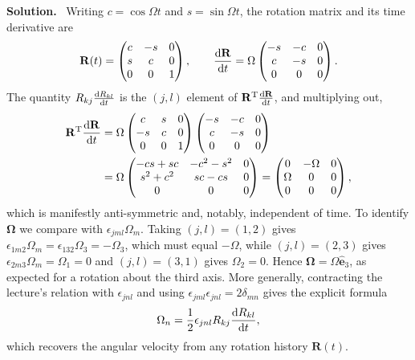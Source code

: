 \documentclass[a4paper,12pt]{paper}
\newenvironment{solution}{\par\noindent\textbf{Solution.}\ }{\par\medskip}
\begin{document}
\begin{solution}
Writing $c=\cos\Omega t$ and $s=\sin\Omega t$, the rotation matrix and its time derivative are
\begin{equation}
\mathbf{R}(t)=\begin{pmatrix}c&-s&0\\ s&c&0\\ 0&0&1\end{pmatrix},\qquad
\frac{\mathrm{d}\mathbf{R}}{\mathrm{d} t}=\Omega\begin{pmatrix}-s&-c&0\\ c&-s&0\\ 0&0&0\end{pmatrix}.
\label{eq:13}
\end{equation}
The quantity $R_{kj}\frac{\mathrm{d} R_{kl}}{\mathrm{d} t}$ is the $(j,l)$ element of
$\mathbf{R}^{\mathrm{T}}\frac{\mathrm{d}\mathbf{R}}{\mathrm{d} t}$, and multiplying out,
\begin{equation}
\begin{split}
\mathbf{R}^{\mathrm{T}}\frac{\mathrm{d}\mathbf{R}}{\mathrm{d} t}
&=\Omega\begin{pmatrix}c&s&0\\ -s&c&0\\ 0&0&1\end{pmatrix}
\begin{pmatrix}-s&-c&0\\ c&-s&0\\ 0&0&0\end{pmatrix}\\
&=\Omega\begin{pmatrix}-cs+sc&-c^{2}-s^{2}&0\\ s^{2}+c^{2}&sc-cs&0\\ 0&0&0\end{pmatrix}
=\begin{pmatrix}0&-\Omega&0\\ \Omega&0&0\\ 0&0&0\end{pmatrix},
\end{split}
\label{eq:14}
\end{equation}
which is manifestly anti-symmetric and, notably, independent of time. To identify $\bm{\Omega}$ we
compare with $\epsilon_{jml}\Omega_{m}$. Taking $(j,l)=(1,2)$ gives
$\epsilon_{1m2}\Omega_{m}=\epsilon_{132}\Omega_{3}=-\Omega_{3}$, which must equal $-\Omega$, while
$(j,l)=(2,3)$ gives $\epsilon_{2m3}\Omega_{m}=\Omega_{1}=0$ and $(j,l)=(3,1)$ gives $\Omega_{2}=0$.
Hence $\bm{\Omega}=\Omega\hat{\mathbf{e}}_{3}$, as expected for a rotation about the third axis. More
generally, contracting the lecture's relation with $\epsilon_{jnl}$ and using
$\epsilon_{jml}\epsilon_{jnl}=2\delta_{mn}$ gives the explicit formula
\begin{equation}
\Omega_{n}=\frac{1}{2}\epsilon_{jnl}R_{kj}\frac{\mathrm{d} R_{kl}}{\mathrm{d} t},
\label{eq:15}
\end{equation}
which recovers the angular velocity from any rotation history $\mathbf{R}(t)$.


\end{solution}
\end{document}
